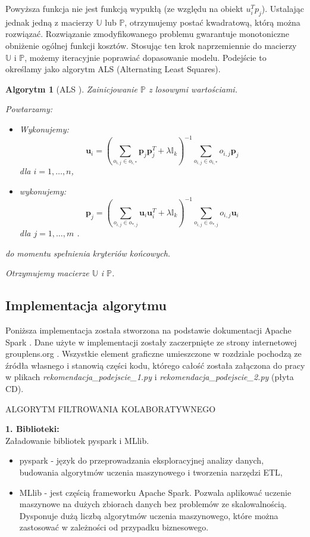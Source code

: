 \documentclass[12pt,a4paper]{report}
\newtheorem{algorytm}[df]{Algorytm}
\begin{document}
Powyższa funkcja nie jest funkcją wypukłą (ze względu na obiekt $u_i^Tp_j$). Ustalając jednak jedną z macierzy $\mathbb{U}$ lub $\mathbb{P}$, otrzymujemy postać kwadratową, którą można rozwiązać. Rozwiązanie zmodyfikowanego problemu gwarantuje monotoniczne obniżenie ogólnej funkcji kosztów. Stosując ten krok naprzemiennie do macierzy $\mathbb{U}$ i $\mathbb{P}$, możemy iteracyjnie poprawiać dopasowanie modelu. Podejście to określamy jako algorytm ALS (Alternating Least Squares).

\begin{algorytm}[ALS {\citep{mcvals}}]
Zainicjowanie $\mathbb{P}$ z losowymi wartościami.

Powtarzamy:
\begin{itemize}
\item Wykonujemy:
$$
\mathbf{u}_i = (\sum_{o_{i,j} \in o_{i,*}} \mathbf{p}_j \mathbf{p}_j^T + \lambda \mathbb{I}_k)^{-1} \sum_{o_{i,j} \in o_{i,*}} o_{i,j}\mathbf{p}_j
$$
dla $i = 1, \ldots, n $,
\item wykonujemy:
$$
\mathbf{p}_j = (\sum_{o_{i,j} \in o_{*,j}} \mathbf{u}_i \mathbf{u}_i^T + \lambda \mathbb{I}_k)^{-1} \sum_{o_{i,j} \in o_{*,j}} o_{i,j}\mathbf{u}_i
$$
dla $j = 1, \ldots, m$ .
\end{itemize}
do momentu spełnienia kryteriów końcowych.

Otrzymujemy macierze $\mathbb{U}$ i $\mathbb{P}$.
\end{algorytm}

\subsection{Implementacja algorytmu}
Poniższa implementacja została stworzona na podstawie dokumentacji Apache Spark {\citep{apache}}. Dane użyte w implementacji zostały zaczerpnięte ze strony internetowej grouplens.org {\citep{dane}}. Wszystkie element graficzne umieszczone w rozdziale pochodzą ze źródła własnego i stanowią części kodu, którego całość została załączona do pracy w plikach \textit{rekomendacja\_podejscie\_1.py} i \textit{rekomendacja\_podejscie\_2.py} (płyta CD).
\bigskip
\begin{center}
ALGORYTM FILTROWANIA KOLABORATYWNEGO
\end{center}

\textbf{1. Biblioteki:}
\\Załadowanie bibliotek pyspark i  MLlib.
\begin{itemize}
\item pyspark - język do przeprowadzania eksploracyjnej analizy danych, budowania algorytmów uczenia maszynowego i tworzenia narzędzi ETL,
\item MLlib - jest częścią frameworku Apache Spark. Pozwala aplikować uczenie maszynowe na dużych zbiorach danych bez problemów ze skalowalnością. Dysponuje dużą liczbą algorytmów uczenia maszynowego, które można zastosować w zależności od przypadku biznesowego.
\end{itemize}
\end{document}
